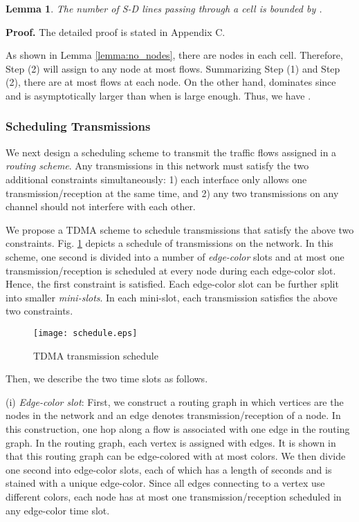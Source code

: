 \documentclass[10pt,journal]{IEEEtran}
\newtheorem{lemma}{Lemma}
\def\done{\hspace*{\fill} }
\begin{document}
\begin{lemma}
\label{lemma:lines}
The number of S-D lines passing through a cell is bounded by .
\end{lemma}
\textbf{Proof.}
The detailed proof is stated in Appendix C. \done

As shown in Lemma \ref{lemma:no_nodes}, there are  nodes in each cell. Therefore, Step (2) will assign to any node at most  flows. Summarizing Step (1) and Step (2), there are at most  flows at each node. On the other hand,  dominates  since  and  is asymptotically larger than  when  is large enough. Thus, we have .

\subsubsection{Scheduling Transmissions}
\label{sec:schedulingscheme}
We next design a scheduling scheme to transmit the traffic flows assigned in a \textit{routing scheme}. Any transmissions in this network must satisfy the two additional constraints simultaneously: 1) each interface only allows one transmission/reception at the same time, and 2) any two transmissions on any channel should not interfere with each other. 

We propose a TDMA scheme to schedule transmissions that satisfy the above two constraints. Fig. \ref{fig:schedule} depicts a schedule of transmissions on the network. In this scheme, one second is divided into a number of \textit{edge-color} slots and at most one transmission/reception is scheduled at every node during each edge-color slot. Hence, the first constraint is satisfied. Each edge-color slot can be further split into smaller \textit{mini-slots}. In each mini-slot, each transmission satisfies the above two constraints. 

\begin{figure}[t!]
\centering
 \texttt{[image: schedule.eps]}
\caption{TDMA transmission schedule}
\label{fig:schedule}
\end{figure}

Then, we describe the two time slots as follows. 

(i) \emph{Edge-color slot}: First, we construct a routing graph in which vertices are the nodes in the network and an edge denotes transmission/reception of a node. In this construction, one hop along a flow is associated with one edge in the routing graph. In the routing graph, each vertex is assigned with  edges. It is shown in \cite{Kyasanur:mobicom2005,Douglas:2001} that this routing graph can be edge-colored with at most  colors. We then divide one second into  edge-color slots, each of which has a length of  seconds and is stained with a unique edge-color. Since all edges connecting to a vertex use different colors, each node has at most one transmission/reception scheduled in any edge-color time slot. 
	
\end{document}
